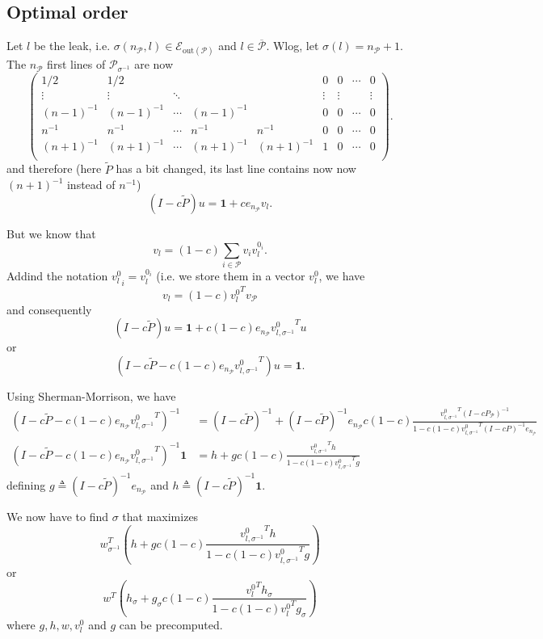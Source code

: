 \documentclass{article}
\newcommand{\1}{\mathbf{1}}
\theoremstyle{definition}
\begin{document}
\subsection{Optimal order}
Let \(l\) be the leak, i.e. \(\sigma(n_\mathcal{P},l) \in \mathcal{E}_{\text{out}(\mathcal{P})}\) and \(l \in \overline{\mathcal{P}}\).
Wlog, let \(\sigma(l) = n_{\mathcal{P}}+1\).
The \(n_\mathcal{P}\) first lines of \(\mathcal{P}_{\sigma^{-1}}\) are now
\[
  \begin{pmatrix}
    1/2 & 1/2 & & & & 0 & 0 & \cdots & 0\\
    \vdots & \vdots & \ddots & & & \vdots & \vdots & & \vdots \\
    (n-1)^{-1} & (n-1)^{-1} & \cdots & (n-1)^{-1} & & 0 & 0 & \cdots & 0\\
    n^{-1} & n^{-1} & \cdots & n^{-1} & n^{-1} & 0 & 0 & \cdots & 0\\
    (n+1)^{-1} & (n+1)^{-1} & \cdots & (n+1)^{-1} & (n+1)^{-1} & 1 & 0 & \cdots & 0\\
  \end{pmatrix}.
\]
and therefore (here $\tilde{P}$ has a bit changed, its last line contains now now $(n+1)^{-1}$ instead of $n^{-1}$)
\[ (I - c\tilde{P})u = \1 + c e_{n_\mathcal{P}} v_l. \]

But we know that
\[ v_l = (1-c) \sum_{i \in \mathcal{P}} v_i v_l^{0_i}. \]
Addind the notation ${v_l^0}_i = v_l^{0_i}$ (i.e. we store them in a vector $v_l^0$,
we have
\[ v_l = (1-c) {v_l^0}^T v_\mathcal{P} \]
and consequently
\[ (I - c\tilde{P})u = \1 + c (1-c) e_{n_\mathcal{P}} {v_{l,\sigma^{-1}}^0}^T u \]
or
\[ (I - c\tilde{P} - c (1-c) e_{n_\mathcal{P}} {v_{l,\sigma^{-1}}^0}^T)u = \1. \]

Using Sherman-Morrison, we have
\begin{align*}
  (I - c\tilde{P} - c (1-c) e_{n_\mathcal{P}} {v_{l,\sigma^{-1}}^0}^T)^{-1} & = (I - c\tilde{P})^{-1} + (I - c\tilde{P})^{-1}e_{n_\mathcal{P}} c(1-c) \frac{{v_{l,\sigma^{-1}}^0}^T(I-cP_\mathcal{P})^{-1}}{1 - c(1-c){v_{l,\sigma^{-1}}^0}^T(I-cP)^{-1}e_{n_\mathcal{P}}}\\
  (I - c\tilde{P} - c (1-c) e_{n_\mathcal{P}} {v_{l,\sigma^{-1}}^0}^T)^{-1}\1 & = h + g c(1-c) \frac{{v_{l,\sigma^{-1}}^0}^Th}{1 - c(1-c){v_{l,\sigma^{-1}}^0}^Tg}
\end{align*}
defining \(g \triangleq (I - c\tilde{P})^{-1}e_{n_\mathcal{P}}\) and \(h \triangleq (I - c\tilde{P})^{-1}\1\).

We now have to find $\sigma$ that maximizes
\[ w_{\sigma^{-1}}^T \left(h + g c(1-c) \frac{{v_{l,\sigma^{-1}}^0}^Th}{1 - c(1-c){v_{l,\sigma^{-1}}^0}^Tg}\right) \]
or
\[ w^T \left(h_\sigma + g_\sigma c(1-c) \frac{{v_l^0}^Th_\sigma}{1 - c(1-c){v_l^0}^Tg_\sigma}\right) \]
where \(g,h,w,v_l^0\) and \(g\) can be precomputed.
\end{document}
